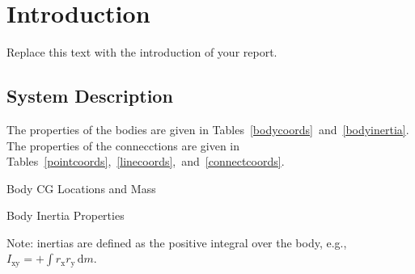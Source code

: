 \chapter{Introduction}
Replace this text with the introduction of your report.
\section{System Description}
The properties of the bodies are given in Tables~\ref{bodycoords}~and~\ref{bodyinertia}.
The properties of the connecctions are given in Tables~\ref{pointcoords},~\ref{linecoords},~and~\ref{connectcoords}.
\begin{table}[ht]
\begin{center}
\begin{threeparttable}
\begin{footnotesize}
\caption{Body CG Locations and Mass}
\label{bodycoords}
\end{footnotesize}
\end{threeparttable}
\end{center}
\end{table}
\begin{table}[ht]
\begin{center}
\begin{threeparttable}
\begin{footnotesize}
\caption{Body Inertia Properties}
\label{bodyinertia}
\begin{tablenotes}
\item Note: inertias are defined as the positive integral over the body, e.g., $I_{\textrm{xy}}=+\! \int \! r_{\textrm{x}}r_{\textrm{y}} \,\text{d}m $.
\end{tablenotes}
\end{footnotesize}
\end{threeparttable}
\end{center}
\end{table}
